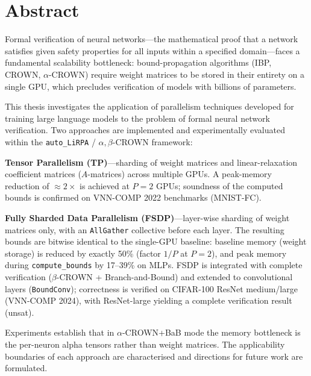 \section*{Abstract}

Formal verification of neural networks---the mathematical proof that a network
satisfies given safety properties for all inputs within a specified domain---faces
a fundamental scalability bottleneck: bound-propagation algorithms (IBP, CROWN,
$\alpha$-CROWN) require weight matrices to be stored in their entirety on a single
GPU, which precludes verification of models with billions of parameters.

This thesis investigates the application of parallelism techniques developed for
training large language models to the problem of formal neural network verification.
Two approaches are implemented and experimentally evaluated within the
\texttt{auto\_LiRPA} / $\alpha,\beta$-CROWN framework:

\textbf{Tensor Parallelism (TP)}---sharding of weight matrices and linear-relaxation
coefficient matrices ($A$-matrices) across multiple GPUs. A peak-memory reduction of
$\approx\!2\times$ is achieved at $P=2$ GPUs; soundness of the computed bounds is
confirmed on VNN-COMP 2022 benchmarks (MNIST-FC).

\textbf{Fully Sharded Data Parallelism (FSDP)}---layer-wise sharding of weight
matrices only, with an \texttt{AllGather} collective before each layer.
The resulting bounds are bitwise identical to the single-GPU baseline: baseline
memory (weight storage) is reduced by exactly 50\% (factor $1/P$ at $P{=}2$),
and peak memory during \texttt{compute\_bounds} by 17--39\% on MLPs. FSDP is integrated with
complete verification ($\beta$-CROWN + Branch-and-Bound) and extended to
convolutional layers (\texttt{BoundConv}); correctness is verified on
CIFAR-100 ResNet medium/large (VNN-COMP 2024), with ResNet-large yielding a
complete verification result (unsat).

Experiments establish that in $\alpha$-CROWN+BaB mode the memory bottleneck
is the per-neuron alpha tensors rather than weight matrices. The applicability
boundaries of each approach are characterised and directions for future work are formulated.
